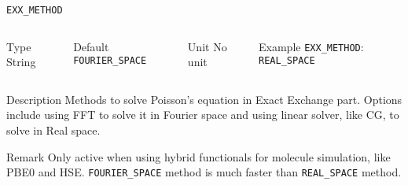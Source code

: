 \documentclass[xcolor=dvipsnames,t]{beamer}
\begin{document}
\begin{frame}[allowframebreaks]{\texttt{EXX\_METHOD}} \label{EXX_METHOD}
\vspace*{-12pt}
\begin{columns}
\begin{block}{Type}
String
\end{block}

\begin{block}{Default}
\texttt{FOURIER\_SPACE}
\end{block}

\begin{block}{Unit}
No unit
\end{block}

\begin{block}{Example}
\texttt{EXX\_METHOD}: \texttt{REAL\_SPACE}
\end{block}
\end{columns}

\begin{block}{Description}
Methods to solve Poisson's equation in Exact Exchange part. Options include using FFT to solve it in Fourier space and using linear solver, like CG, to solve in Real space.
\end{block}

\begin{block}{Remark}
Only active when using hybrid functionals for molecule simulation, like PBE0 and HSE. 
\texttt{FOURIER\_SPACE} method is much faster than \texttt{REAL\_SPACE} method.
\end{block}

\end{frame}
\end{document}
